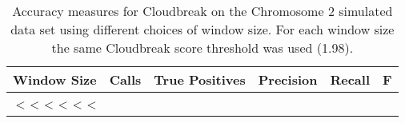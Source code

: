 \begin{table}
\begin{center}
\begin{tabular}{r|rrrrr}
 \hline
 Window Size & Calls & True Positives & Precision & Recall & F \\ 
 \hline
   <%
   <%
   <%
   <%
   <%
   <%
\end{tabular}
\end{center}
\caption{Accuracy measures for Cloudbreak on the Chromosome 2 simulated data set using different choices of window size. For each window size the same Cloudbreak score threshold was used (1.98).}
\label{chr2AccuracyByWindowSize}
\end{table}

